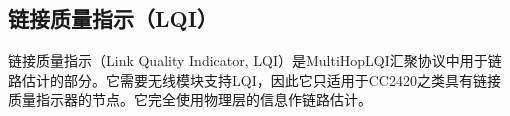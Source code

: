 \subsection{链接质量指示（LQI）}
链接质量指示（Link Quality Indicator, LQI）是MultiHopLQI汇聚协议中用于链路估计的部分。它需要无线模块支持LQI，因此它只适用于CC2420之类具有链接质量指示器的节点。它完全使用物理层的信息作链路估计。
